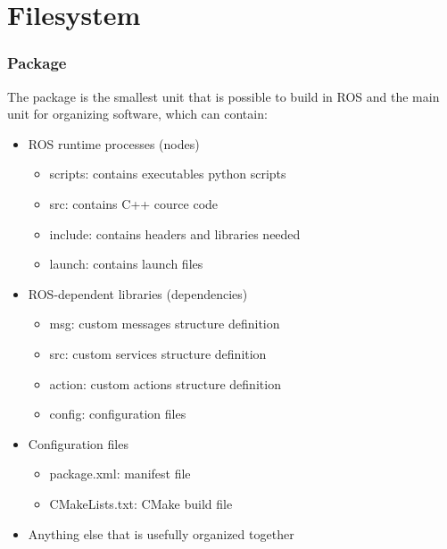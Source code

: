 \part{Filesystem}


    
    \section{Package}
    
        The package is the smallest unit that is possible to build in ROS and the main unit for organizing software, which can contain:
        \begin{itemize}
            \item ROS runtime processes (nodes)
            \begin{itemize}
                \item scripts: contains executables python scripts
                \item src: contains C++ cource code
                \item include: contains headers and libraries needed
                \item launch: contains launch files
            \end{itemize}    
            \item ROS-dependent libraries (dependencies)
            \begin{itemize}
                \item msg: custom messages structure definition
                \item src: custom services structure definition
                \item action: custom actions structure definition
                \item config: configuration files
            \end{itemize}    
            \item Configuration files
            \begin{itemize}
                \item package.xml: manifest file
                \item CMakeLists.txt: CMake build file
            \end{itemize}
            \item Anything else that is usefully organized together
        \end{itemize}    

